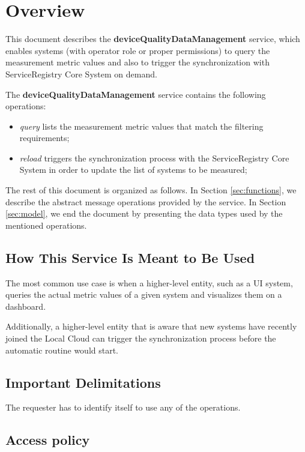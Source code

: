 \documentclass[a4paper]{arrowhead}
\begin{document}
\section{Overview}
\label{sec:overview}
This document describes the \textbf{deviceQualityDataManagement} service, which enables systems (with operator role or proper permissions) to query the measurement metric values and also to trigger the synchronization with ServiceRegistry Core System on demand.

The \textbf{deviceQualityDataManagement} service contains the following operations:

\begin{itemize}
    \item \textit{query} lists the measurement metric values that match the filtering requirements;
    \item \textit{reload} triggers the synchronization process with the ServiceRegistry Core System in order to update the list of systems to be measured;
\end{itemize}

The rest of this document is organized as follows.
In Section \ref{sec:functions}, we describe the abstract message operations provided by the service.
In Section \ref{sec:model}, we end the document by presenting the data types used by the mentioned operations.

\subsection{How This Service Is Meant to Be Used}

The most common use case is when a higher-level entity, such as a UI system, queries the actual metric values of a given system and visualizes them on a dashboard.

Additionally, a higher-level entity that is aware that new systems have recently joined the Local Cloud can trigger the synchronization process before the automatic routine would start.

\subsection{Important Delimitations}
\label{sec:delimitations}

The requester has to identify itself to use any of the operations. 

\subsection{Access policy}
\label{sec:accesspolicy}
\end{document}
